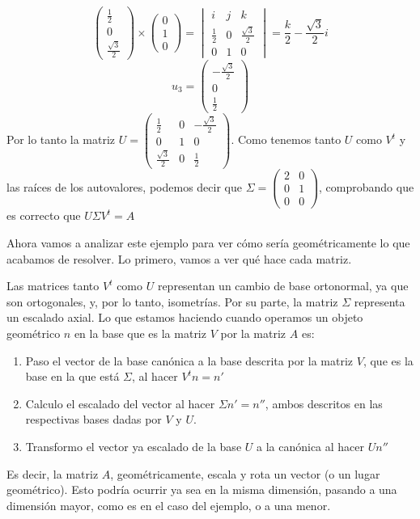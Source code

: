 \[
	\begin{pmatrix}
		\frac{1}{2} \\
		0           \\
		\frac{\sqrt3}{2}
	\end{pmatrix}
	\times
	\begin{pmatrix}
		0 \\
		1 \\
		0
	\end{pmatrix}
	=
	\begin{vmatrix}
		i           & j & k                \\
		\frac{1}{2} & 0 & \frac{\sqrt3}{2} \\
		0           & 1 & 0
	\end{vmatrix}
	=
	\frac{k}{2}-\frac{\sqrt3}{2}i
\]
\[
	u_3=\begin{pmatrix}
		-\frac{\sqrt3}{2} \\
		0                 \\
		\frac{1}{2}
	\end{pmatrix}
\]
Por lo tanto la matriz $U=\begin{pmatrix}
		\frac{1}{2}      & 0 & -\frac{\sqrt3}{2} \\
		0                & 1 & 0                 \\
		\frac{\sqrt3}{2} & 0 & \frac{1}{2}
	\end{pmatrix}$. Como tenemos tanto $U$ como $V^t$ y las raíces de los autovalores, podemos decir que $\Sigma=\begin{pmatrix}
		2 & 0 \\
		0 & 1 \\
		0 & 0
	\end{pmatrix}$, comprobando que es correcto que $U\Sigma V^t=A$

Ahora vamos a analizar este ejemplo para ver cómo sería geométricamente lo que acabamos de resolver. Lo primero, vamos a ver qué hace cada matriz.

Las matrices tanto $V^t$ como $U$ representan un cambio de base ortonormal, ya que son ortogonales, y, por lo tanto, isometrías. Por su parte, la matriz $\Sigma$ representa un escalado axial. Lo que estamos haciendo cuando operamos un objeto geométrico $n$ en la base que es la matriz $V$ por la matriz $A$ es:\begin{enumerate}
	\item Paso el vector de la base canónica a la base descrita por la matriz $V$, que es la base en la que está $\Sigma$, al hacer $V^tn=n'$
	\item Calculo el escalado del vector al hacer $\Sigma n'=n''$, ambos descritos en las respectivas bases dadas por $V$ y $U$.
	\item Transformo el vector ya escalado de la base $U$ a la canónica al hacer $Un''$
\end{enumerate}
Es decir, la matriz $A$, geométricamente, escala y rota un vector (o un lugar geométrico). Esto podría ocurrir ya sea en la misma dimensión, pasando a una dimensión mayor, como es en el caso del ejemplo, o a una menor.

